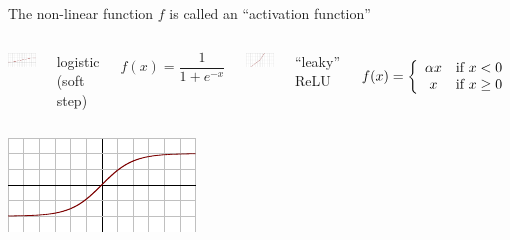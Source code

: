 \documentclass[aspectratio=169]{beamer}
\begin{document}
\begin{frame}{The non-linear function $f$ is called an ``activation function''}
\vspace{0.5cm}
\begin{columns}
\includegraphics[width=\linewidth]{img/Activation_logistic.pdf}

logistic (soft step)

\vspace{-\baselineskip}
\[ f(x) = \frac{1}{1 + e^{-x}} \]

\includegraphics[width=\linewidth]{img/Activation_prelu.pdf}


``leaky'' ReLU

\vspace{-\baselineskip}
\[ f(x) = \left\{ \begin{array}{c l}
\alpha x & \text{if } x < 0 \\
x & \text{if } x \ge 0 \\
\end{array} \right. \]
\end{columns}

\vspace{0.5cm}
\begin{columns}
\includegraphics[width=\linewidth]{img/Activation_tanh.pdf}


\end{columns}
\end{frame}
\end{document}
